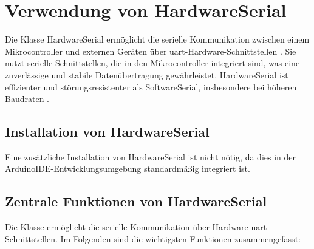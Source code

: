 \begin{center}
	\label{Code:Beispielcode für die SoftwareSerial-Bibliothek}
\end{center}

\section{Verwendung von HardwareSerial}

Die Klasse HardwareSerial ermöglicht die serielle Kommunikation zwischen einem Mikrocontroller und externen Geräten über \ac{uart}-Hardware-Schnittstellen \cite{Arduino:2025HardwareSerial}. Sie nutzt serielle Schnittstellen, die in den Mikrocontroller integriert sind, was eine zuverlässige und stabile Datenübertragung gewährleistet. HardwareSerial ist effizienter und störungsresistenter als SoftwareSerial, insbesondere bei höheren Baudraten \cite{Monk:2016}.

\subsection{Installation von HardwareSerial}

Eine zusätzliche Installation von HardwareSerial ist nicht nötig, da dies in der ArduinoIDE-Entwicklungsumgebung standardmäßig integriert ist. \cite{Arduino:2025HardwareSerialb}

\subsection{Zentrale Funktionen von HardwareSerial}

Die Klasse  ermöglicht die serielle Kommunikation über Hardware-\ac{uart}-Schnittstellen. Im Folgenden sind die wichtigsten Funktionen zusammengefasst:

